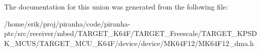 The documentation for this union was generated from the following file\+:\begin{DoxyCompactItemize}
\item 
/home/erik/proj/piranha/code/piranha-\/ptc/src/receiver/mbed/\+T\+A\+R\+G\+E\+T\+\_\+\+K64\+F/\+T\+A\+R\+G\+E\+T\+\_\+\+Freescale/\+T\+A\+R\+G\+E\+T\+\_\+\+K\+P\+S\+D\+K\+\_\+\+M\+C\+U\+S/\+T\+A\+R\+G\+E\+T\+\_\+\+M\+C\+U\+\_\+\+K64\+F/device/device/\+M\+K64\+F12/M\+K64\+F12\+\_\+dma.\+h\end{DoxyCompactItemize}
